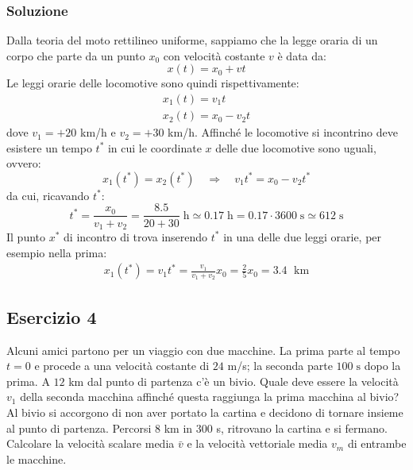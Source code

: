 \documentclass[12pt,a4paper]{book}
\begin{document}
\subsubsection*{Soluzione}
Dalla teoria del moto rettilineo uniforme, sappiamo che la legge oraria di un corpo che parte da un punto $x_0$ con velocità costante $v$ è data da:\\
\begin{equation*}
x(t)=x_0+vt
\end{equation*}
Le leggi orarie delle locomotive sono quindi rispettivamente:
\begin{gather*}
x_1(t)=v_1 t \\
x_2(t)=x_0 - v_2 t
\end{gather*}
dove $v_1=+20$ km/h e $v_2=+30$ km/h. Affinché le locomotive si incontrino deve esistere un tempo $t^*$ in cui le coordinate $x$ delle due locomotive sono uguali, ovvero:\\
\begin{equation*}
x_1 (t^*) = x_2(t^*) \quad \Rightarrow \quad v_1  t^* = x_0 - v_2  t^* 
\end{equation*}
da cui, ricavando $t^*$:\\
\begin{equation*}
t^* = \frac{x_0}{v_1 + v_2} = \frac{8.5}{20 +30} \; \text{h} \simeq 0.17 \; \text{h} = 0.17 \cdot 3600 \; \text{s} \simeq 612 \; \text{s}
\end{equation*}
Il punto $x^*$ di incontro di trova inserendo $t^*$ in una delle due leggi orarie, per esempio nella prima: 
\begin{gather*}
x_1(t^*)=v_1 t^*= \frac{v_1}{v_1 + v_2} x_0= \frac{2}{5}x_0=3.4 \; \text{ km}
\end{gather*}

\subsection*{Esercizio 4}
Alcuni amici partono per un viaggio con due macchine. La prima parte al tempo $t=0$ e procede a una velocità costante di $24$ m/s; la seconda parte $100\;\text{s}$ dopo la prima. A $12$ km dal punto di partenza c’è un bivio. Quale deve essere la velocità $v_1$ della seconda macchina affinché questa raggiunga la prima macchina al bivio? Al bivio si accorgono di non aver portato la cartina e decidono di tornare insieme al punto di partenza. Percorsi 8 km in 300 s, ritrovano la cartina e si fermano. Calcolare la velocità scalare media $\bar{v}$ e la velocità vettoriale media $v_m$ di entrambe le macchine.
\end{document}
